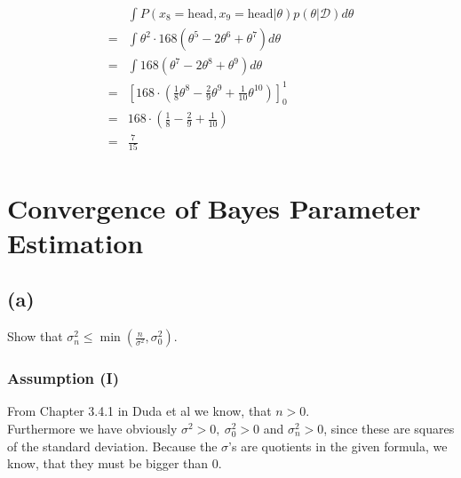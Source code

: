 \documentclass{article}
\begin{document}
\begin{align}
\begin{aligned}
	& \int P(x_8 = \text{head}, x_9 = \text{head} | \theta) p(\theta|\mathcal{D}) d\theta\\
=	& \int \theta^2 \cdot 168(\theta^5 - 2 \theta ^6 + \theta^7) d\theta\\
=	& \int 168(\theta^7 - 2 \theta ^8 + \theta^9) d\theta\\
=	& \left[ 168 \cdot(\frac{1}{8}\theta^8 - \frac{2}{9} \theta ^9 + \frac{1}{10}\theta^{10}) \right]_0^1\\
=	& 168 \cdot (\frac{1}{8} - \frac{2}{9} + \frac{1}{10})\\
=	& \frac{7}{15}
\end{aligned}
\end{align}


\section{Convergence of Bayes Parameter Estimation}

\subsection*{(a)}
Show that $ \sigma^2_n \leq \min \left (\frac{n}{\sigma^2},\sigma^2_0 \right )$.
\subsubsection*{Assumption (I)}
From Chapter 3.4.1 in Duda et al we know, that $n > 0$.\\
Furthermore we have obviously $\sigma^2 > 0, ~\sigma^2_0 > 0$ and $\sigma^2_n > 0$, since these are squares of the standard deviation. Because the $\sigma$'s are quotients in the given formula, we know, that they must be bigger than $0$.\\
\end{document}
